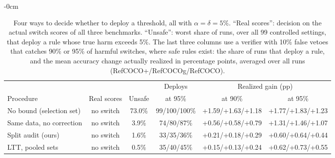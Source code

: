 \begin{table}[htbp]
\begin{adjustwidth}{-\extralength}{0cm}
\caption{Four ways to decide whether to deploy a threshold, all with
$\alpha=\delta=5\%$.  ``Real scores'': decision on the actual switch scores of
all three benchmarks.  ``Unsafe'': worst share of runs, over all 99 controlled
settings, that deploy a rule whose true harm exceeds 5\%.  The last three
columns use a verifier with 10\% false vetoes that catches 90\% or 95\% of
harmful switches, where safe rules exist: the share of runs that deploy a rule,
and the mean accuracy change actually realized in percentage points, averaged
over all runs (RefCOCO+/RefCOCOg/RefCOCO).\label{tab:procedures}}
\centering
\small
\setlength{\tabcolsep}{4pt}
\begin{tabular}{@{}lccccc@{}}
\toprule
& & & Deploys & \multicolumn{2}{c}{Realized gain (pp)} \\
\cmidrule(l){5-6}
Procedure & Real scores & Unsafe & at 95\% & at 90\% & at 95\% \\
\midrule
No bound (selection set) & no switch & 73.0\% & 99/100/100\% & +1.59/+1.63/+1.18 & +1.77/+1.83/+1.23 \\
Same data, no correction & no switch & 3.9\% & 74/80/87\% & +0.56/+0.58/+0.79 & +1.31/+1.46/+1.07 \\
Split audit (ours) & no switch & 1.6\% & 33/35/36\% & +0.21/+0.18/+0.29 & +0.60/+0.64/+0.44 \\
LTT, pooled sets & no switch & 0.5\% & 35/40/45\% & +0.15/+0.13/+0.24 & +0.62/+0.73/+0.55 \\
\bottomrule
\end{tabular}
\end{adjustwidth}
\end{table}
